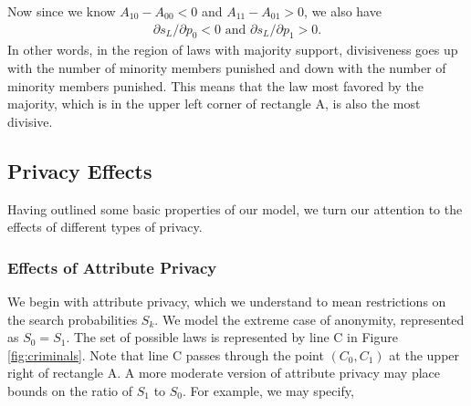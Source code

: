 %

Now since we know $A_{10} - A_{00}  < 0$ and $A_{11} - A_{01} > 0$, we also have
\begin{align}
\partial s_L / \partial p_0 <0  \text{ and } \partial s_L / \partial p_1 >0.
\end{align}
In other words, in the region of laws with majority support, divisiveness goes up with the number of minority members punished and down with the number of minority members punished.  This means that the law most favored by the majority, which is in the upper left corner of rectangle A, is also the most divisive.

\subsection{Privacy Effects}
Having outlined some basic properties of our model, we turn our attention to the effects of different types of privacy.  

\subsubsection{Effects of Attribute Privacy}
We begin with attribute privacy, which we understand to mean restrictions on the search probabilities $S_k$.  We model the extreme case of anonymity, represented as $S_0 = S_1$.  The set of possible laws is represented by line C in Figure \ref{fig:criminals}.  Note that line C passes through the point $ \left(C_0, C_1 \right)$ at the upper right of rectangle A.  A more moderate version of attribute privacy may place bounds on the ratio of $S_1$ to $S_0$.  For example, we may specify,

